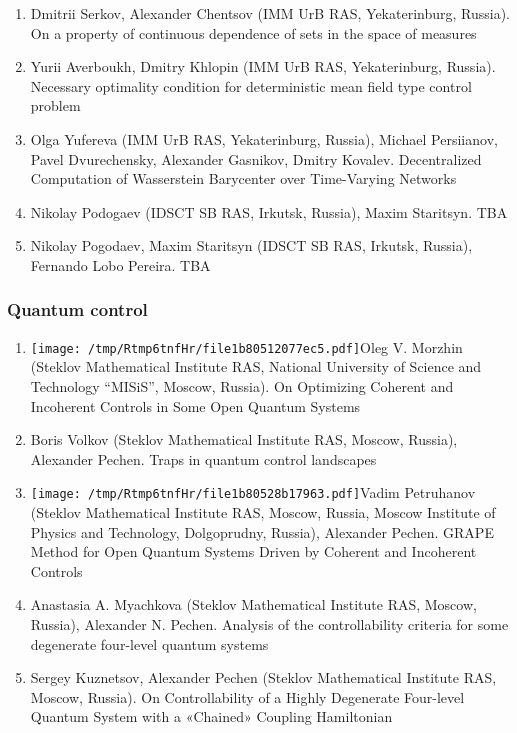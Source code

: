 \documentclass[
]{article}
\providecommand{\tightlist}{%
  \setlength{\itemsep}{0pt}\setlength{\parskip}{0pt}}
\begin{document}
\begin{enumerate}
\def\labelenumi{\arabic{enumi}.}
\tightlist
\item
  Dmitrii Serkov, Alexander Chentsov (IMM UrB RAS, Yekaterinburg,
  Russia). On a property of continuous dependence of sets in the space
  of measures
\item
  Yurii Averboukh, Dmitry Khlopin (IMM UrB RAS, Yekaterinburg, Russia).
  Necessary optimality condition for deterministic mean field type
  control problem
\item
  Olga Yufereva (IMM UrB RAS, Yekaterinburg, Russia), Michael
  Persiianov, Pavel Dvurechensky, Alexander Gasnikov, Dmitry Kovalev.
  Decentralized Computation of Wasserstein Barycenter over Time-Varying
  Networks
\item
  Nikolay Podogaev (IDSCT SB RAS, Irkutsk, Russia), Maxim Staritsyn. TBA
\item
  Nikolay Pogodaev, Maxim Staritsyn (IDSCT SB RAS, Irkutsk, Russia),
  Fernando Lobo Pereira. TBA
\end{enumerate}

\hypertarget{qc}{%
\subsubsection{Quantum control}\label{qc}}

\begin{enumerate}
\def\labelenumi{\arabic{enumi}.}
\tightlist
\item
  \protect\texttt{[image: /tmp/Rtmp6tnfHr/file1b80512077ec5.pdf]}Oleg
  V. Morzhin (Steklov Mathematical Institute RAS, National University of
  Science and Technology ``MISiS'', Moscow, Russia). On Optimizing
  Coherent and Incoherent Controls in Some Open Quantum Systems
\item
  Boris Volkov (Steklov Mathematical Institute RAS, Moscow, Russia),
  Alexander Pechen. Traps in quantum control landscapes
\item
  \protect\texttt{[image: /tmp/Rtmp6tnfHr/file1b80528b17963.pdf]}Vadim
  Petruhanov (Steklov Mathematical Institute RAS, Moscow, Russia, Moscow
  Institute of Physics and Technology, Dolgoprudny, Russia), Alexander
  Pechen. GRAPE Method for Open Quantum Systems Driven by Coherent and
  Incoherent Controls
\item
  Anastasia A. Myachkova (Steklov Mathematical Institute RAS, Moscow,
  Russia), Alexander N. Pechen. Analysis of the controllability criteria
  for some degenerate four-level quantum systems
\item
  Sergey Kuznetsov, Alexander Pechen (Steklov Mathematical Institute
  RAS, Moscow, Russia). On Controllability of a Highly Degenerate
  Four-level Quantum System with a «Chained» Coupling Hamiltonian
\end{enumerate}
\end{document}
